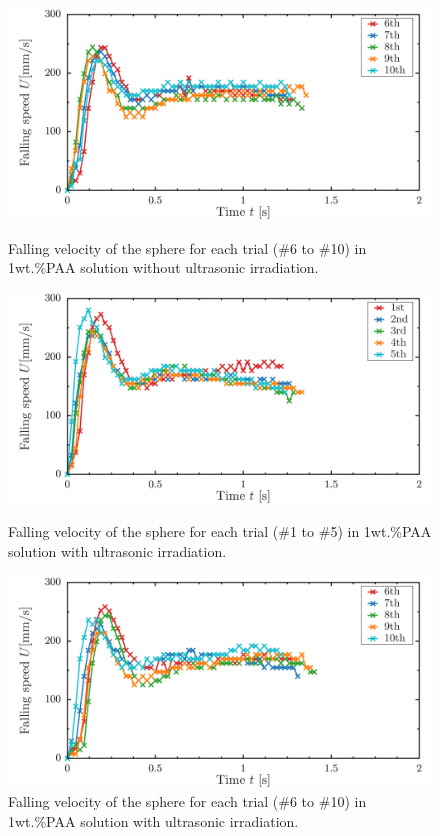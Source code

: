 \begin{figure}[ht]
    \centering
    \includegraphics[width=12cm,clip]{X-Appendix/s1-0-6-10.png}
    \caption{Falling velocity of the sphere for each trial (\#6 to \#10) in 1wt.\%PAA solution without ultrasonic irradiation.}
    \label{fig:1-1PAA-falling6-10}
    \centering
    \includegraphics[width=12cm,clip]{X-Appendix/s1-39-1-5.png}
    \caption{Falling velocity of the sphere for each trial (\#1 to \#5) in 1wt.\%PAA solution with ultrasonic irradiation.}
    \label{fig:1-1onPAA-falling1-5}
    \centering
    \includegraphics[width=12cm,clip]{X-Appendix/s1-39-6-10.png}
    \caption{Falling velocity of the sphere for each trial (\#6 to \#10) in 1wt.\%PAA solution with ultrasonic irradiation.}
    \label{fig:1-1onPAA-falling6-10}
\end{figure}
\clearpage

